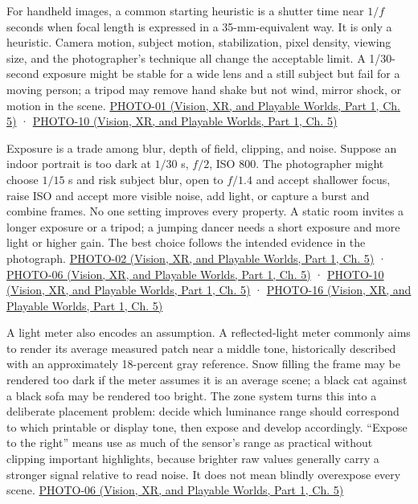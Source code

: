 For handheld images, a common starting heuristic is a shutter time near \(1/f\) seconds when focal length is expressed in a 35-mm-equivalent way. It is only a heuristic. Camera motion, subject motion, stabilization, pixel density, viewing size, and the photographer's technique all change the acceptable limit. A 1/30-second exposure might be stable for a wide lens and a still subject but fail for a moving person; a tripod may remove hand shake but not wind, mirror shock, or motion in the scene. \href{../07-Vision-XR-and-Playable-Worlds-P01/main.pdf\#nameddest=04-visual-computing-ii-ch036-photo-01---photography-session-01}{PHOTO-01 (Vision, XR, and Playable Worlds, Part 1, Ch. 5)} · \href{../07-Vision-XR-and-Playable-Worlds-P01/main.pdf\#nameddest=04-visual-computing-ii-ch036-photo-10---photography-session-10}{PHOTO-10 (Vision, XR, and Playable Worlds, Part 1, Ch. 5)}

Exposure is a trade among blur, depth of field, clipping, and noise. Suppose an indoor portrait is too dark at \(1/30\) s, \(f/2\), ISO 800. The photographer might choose \(1/15\) s and risk subject blur, open to \(f/1.4\) and accept shallower focus, raise ISO and accept more visible noise, add light, or capture a burst and combine frames. No one setting improves every property. A static room invites a longer exposure or a tripod; a jumping dancer needs a short exposure and more light or higher gain. The best choice follows the intended evidence in the photograph. \href{../07-Vision-XR-and-Playable-Worlds-P01/main.pdf\#nameddest=04-visual-computing-ii-ch036-photo-02---photography-session-02}{PHOTO-02 (Vision, XR, and Playable Worlds, Part 1, Ch. 5)} · \href{../07-Vision-XR-and-Playable-Worlds-P01/main.pdf\#nameddest=04-visual-computing-ii-ch036-photo-06---photography-session-06}{PHOTO-06 (Vision, XR, and Playable Worlds, Part 1, Ch. 5)} · \href{../07-Vision-XR-and-Playable-Worlds-P01/main.pdf\#nameddest=04-visual-computing-ii-ch036-photo-10---photography-session-10}{PHOTO-10 (Vision, XR, and Playable Worlds, Part 1, Ch. 5)} · \href{../07-Vision-XR-and-Playable-Worlds-P01/main.pdf\#nameddest=04-visual-computing-ii-ch036-photo-16---photography-session-16}{PHOTO-16 (Vision, XR, and Playable Worlds, Part 1, Ch. 5)}

A light meter also encodes an assumption. A reflected-light meter commonly aims to render its average measured patch near a middle tone, historically described with an approximately 18-percent gray reference. Snow filling the frame may be rendered too dark if the meter assumes it is an average scene; a black cat against a black sofa may be rendered too bright. The zone system turns this into a deliberate placement problem: decide which luminance range should correspond to which printable or display tone, then expose and develop accordingly. ``Expose to the right'' means use as much of the sensor's range as practical without clipping important highlights, because brighter raw values generally carry a stronger signal relative to read noise. It does not mean blindly overexpose every scene. \href{../07-Vision-XR-and-Playable-Worlds-P01/main.pdf\#nameddest=04-visual-computing-ii-ch036-photo-06---photography-session-06}{PHOTO-06 (Vision, XR, and Playable Worlds, Part 1, Ch. 5)}

